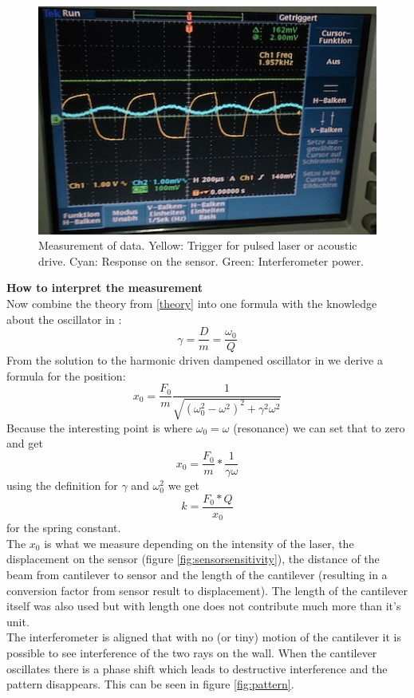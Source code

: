 \documentclass[12pt,a4paper]{article}
\begin{document}
\begin{multicols}{2}
\begin{figure}[H]
	\centering
	\includegraphics[scale=0.5]{../figures/messung.png}
	\caption{Measurement of data. Yellow:  Trigger for pulsed laser or acoustic drive. Cyan: Response on the sensor. Green: Interferometer power.}
	\label{fig:measurement}
\end{figure}

\noindent
\textbf{How to interpret the measurement}\\
Now combine the theory from \ref{theory} into one formula with the knowledge about the oscillator in \cite{physikwiki}:
$$\gamma = \frac{D}{m} = \frac{\omega_0}{Q}$$
From the solution to the harmonic driven dampened oscillator in \cite{physikwiki} we derive a formula for the position:
$$x_0 = \frac{F_0}{m}  \frac{1}{\sqrt{ (\omega_0^2 - \omega^2 )^2 + \gamma^2  \omega^2}}$$
Because the interesting point is where $\omega_0 = \omega$ (resonance) we can set that to zero and get
$$x_0 = \frac{F_0}{m} * \frac{1}{\gamma  \omega}$$
using the definition for $\gamma$ and $\omega_0^2$ we get
$$k = \frac{F_0 * Q}{x_0}$$
for the spring constant.\\
The $x_0$ is what we measure depending on the intensity of the laser, the displacement on the sensor (figure \ref{fig:sensorsensitivity}), the distance of the beam from cantilever to sensor and the length of the cantilever (resulting in a conversion factor from sensor result to displacement). The length of the cantilever itself was also used but with length one does not contribute much more than it's unit.\\

The interferometer is aligned that with no (or tiny) motion of the cantilever it is possible to see interference of the two rays on the wall. When the cantilever oscillates there is a phase shift which leads to destructive interference and the pattern disappears. This can be seen in figure \ref{fig:pattern}.


\end{multicols}
\end{document}
